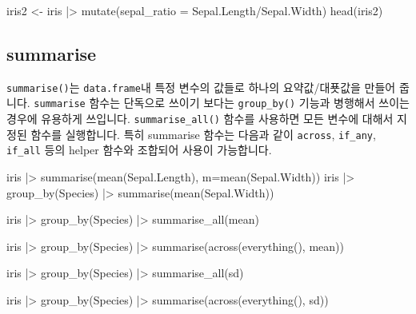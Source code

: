 \documentclass[
  a4paper,
]{book}
\newenvironment{Shaded}{\begin{snugshade}}{\end{snugshade}}
\newcommand{\AttributeTok}[1]{\textcolor[rgb]{0.40,0.45,0.13}{#1}}
\newcommand{\FunctionTok}[1]{\textcolor[rgb]{0.28,0.35,0.67}{#1}}
\newcommand{\NormalTok}[1]{\textcolor[rgb]{0.00,0.23,0.31}{#1}}
\newcommand{\OtherTok}[1]{\textcolor[rgb]{0.00,0.23,0.31}{#1}}
\newcommand{\SpecialCharTok}[1]{\textcolor[rgb]{0.37,0.37,0.37}{#1}}
\begin{document}
\begin{Shaded}
\begin{Highlighting}[]
\NormalTok{iris2 }\OtherTok{\textless{}{-}}\NormalTok{ iris }\SpecialCharTok{|\textgreater{}} \FunctionTok{mutate}\NormalTok{(}\AttributeTok{sepal\_ratio =}\NormalTok{ Sepal.Length}\SpecialCharTok{/}\NormalTok{Sepal.Width)}
\FunctionTok{head}\NormalTok{(iris2)}
\end{Highlighting}
\end{Shaded}

\hypertarget{summarise}{%
\subsection{summarise}\label{summarise}}

\texttt{summarise()}는 \texttt{data.frame}내 특정 변수의 값들로 하나의
요약값/대푯값을 만들어 줍니다. \texttt{summarise} 함수는 단독으로 쓰이기
보다는 \texttt{group\_by()} 기능과 병행해서 쓰이는 경우에 유용하게
쓰입니다. \texttt{summarise\_all()} 함수를 사용하면 모든 변수에 대해서
지정된 함수를 실행합니다. 특히 summarise 함수는 다음과 같이
\texttt{across}, \texttt{if\_any}, \texttt{if\_all} 등의 helper 함수와
조합되어 사용이 가능합니다.

\begin{Shaded}
\begin{Highlighting}[]
\NormalTok{iris }\SpecialCharTok{|\textgreater{}} \FunctionTok{summarise}\NormalTok{(}\FunctionTok{mean}\NormalTok{(Sepal.Length), }\AttributeTok{m=}\FunctionTok{mean}\NormalTok{(Sepal.Width))}
\NormalTok{iris }\SpecialCharTok{|\textgreater{}} 
  \FunctionTok{group\_by}\NormalTok{(Species) }\SpecialCharTok{|\textgreater{}} 
  \FunctionTok{summarise}\NormalTok{(}\FunctionTok{mean}\NormalTok{(Sepal.Width))}

\NormalTok{iris }\SpecialCharTok{|\textgreater{}} 
  \FunctionTok{group\_by}\NormalTok{(Species) }\SpecialCharTok{|\textgreater{}} 
  \FunctionTok{summarise\_all}\NormalTok{(mean)}

\NormalTok{iris }\SpecialCharTok{|\textgreater{}} 
  \FunctionTok{group\_by}\NormalTok{(Species) }\SpecialCharTok{|\textgreater{}} 
  \FunctionTok{summarise}\NormalTok{(}\FunctionTok{across}\NormalTok{(}\FunctionTok{everything}\NormalTok{(), mean))}


\NormalTok{iris }\SpecialCharTok{|\textgreater{}} 
  \FunctionTok{group\_by}\NormalTok{(Species) }\SpecialCharTok{|\textgreater{}} 
  \FunctionTok{summarise\_all}\NormalTok{(sd)}

\NormalTok{iris }\SpecialCharTok{|\textgreater{}} 
  \FunctionTok{group\_by}\NormalTok{(Species) }\SpecialCharTok{|\textgreater{}} 
  \FunctionTok{summarise}\NormalTok{(}\FunctionTok{across}\NormalTok{(}\FunctionTok{everything}\NormalTok{(), sd))}
\end{Highlighting}
\end{Shaded}
\end{document}
